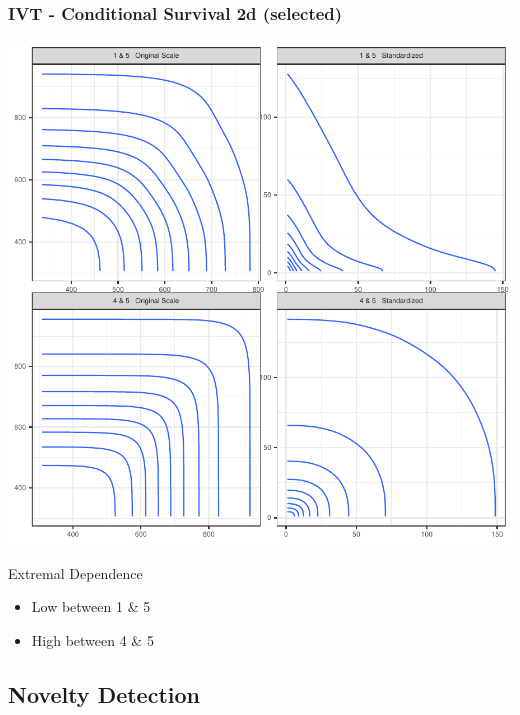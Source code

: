 \documentclass[aspectratio=169,10pt,notes]{beamer}
\newlength{\frametextheight}
\begin{document}
\begin{frame}
    \frametitle{IVT - Conditional Survival 2d (selected)}
    \begin{minipage}{.49\textwidth}
        \centering
        \includegraphics[height=\frametextheight]{./ch1/images/condsurv_2d}
    \end{minipage}
    \begin{minipage}{.49\textwidth}
    Extremal Dependence
        \begin{itemize}
            \item Low between 1 \& 5
            \item High between 4 \& 5
        \end{itemize}
    \end{minipage}
\end{frame} %


\subsection*{Novelty Detection}
\end{document}
